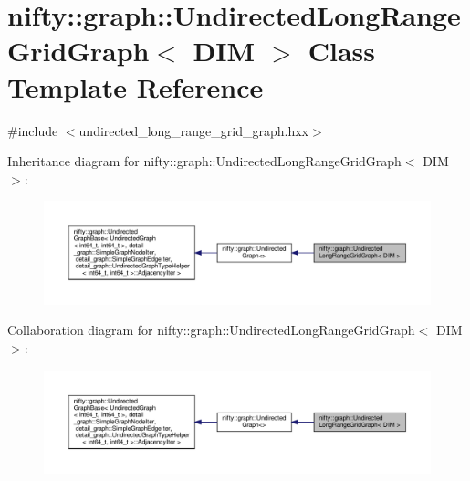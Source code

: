 \hypertarget{classnifty_1_1graph_1_1UndirectedLongRangeGridGraph}{}\section{nifty\+:\+:graph\+:\+:Undirected\+Long\+Range\+Grid\+Graph$<$ D\+IM $>$ Class Template Reference}
\label{classnifty_1_1graph_1_1UndirectedLongRangeGridGraph}


{\ttfamily \#include $<$undirected\+\_\+long\+\_\+range\+\_\+grid\+\_\+graph.\+hxx$>$}



Inheritance diagram for nifty\+:\+:graph\+:\+:Undirected\+Long\+Range\+Grid\+Graph$<$ D\+IM $>$\+:
\nopagebreak
\begin{figure}[H]
\begin{center}
\leavevmode
\includegraphics[width=350pt]{classnifty_1_1graph_1_1UndirectedLongRangeGridGraph__inherit__graph}
\end{center}
\end{figure}


Collaboration diagram for nifty\+:\+:graph\+:\+:Undirected\+Long\+Range\+Grid\+Graph$<$ D\+IM $>$\+:
\nopagebreak
\begin{figure}[H]
\begin{center}
\leavevmode
\includegraphics[width=350pt]{classnifty_1_1graph_1_1UndirectedLongRangeGridGraph__coll__graph}
\end{center}
\end{figure}
